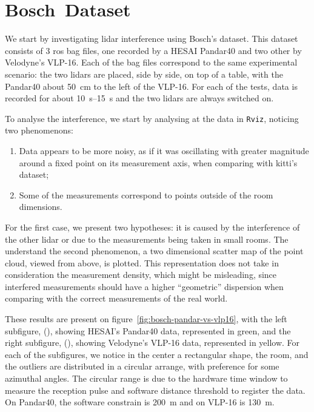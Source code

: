 \section{Bosch\cp~Dataset}
We start by investigating \ac{lidar} interference using Bosch's dataset. This dataset consists of 3 \ac{ros} bag files, one recorded by a HESAI Pandar40 and two other by Velodyne's VLP-16. Each of the bag files correspond to the same experimental scenario: the two \acp{lidar} are placed, side by side, on top of a table, with the Pandar40 about \SI{50}{\centi\meter} to the left of the VLP-16. For each of the tests, data is recorded for about \SIrange{10}{15}{\second} and the two \acp{lidar} are always switched on.

To analyse the interference, we start by analysing at the data in \texttt{Rviz}, noticing two phenomenons: 

\begin{enumerate}
	\item Data appears to be more noisy, as if it was oscillating with greater magnitude around a fixed point on its measurement axis, when comparing with \ac{kitti}'s dataset;
	\item Some of the measurements correspond to points outside of the room dimensions.
\end{enumerate}

For the first case, we present two hypotheses: it is caused by the interference of the other \ac{lidar} or due to the measurements being taken in small rooms. The understand the second phenomenon, a two dimensional scatter map of the point cloud, viewed from above, is plotted. This representation does not take in consideration the measurement density, which might be misleading, since interfered measurements should have a higher ``geometric'' dispersion when comparing with the correct measurements of the real world.

These results are present on figure~\ref{fig:bosch-pandar-vs-vlp16}, with the left subfigure, (), showing HESAI's Pandar40 data, represented in green, and the right subfigure, (), showing Velodyne's VLP-16 data, represented in yellow. For each of the subfigures, we notice in the center a rectangular shape, the room, and the outliers are distributed in a circular arrange, with preference for some azimuthal angles. The circular range is due to the hardware time window to measure the reception pulse and software distance threshold to register the data. On Pandar40, the software constrain is \SI{200}{\meter} and on VLP-16 is \SI{130}{\meter}. 

